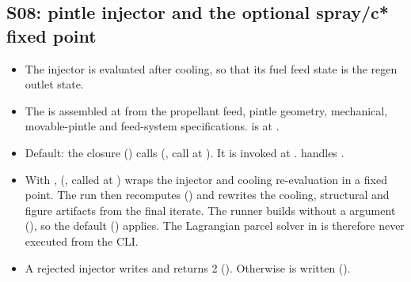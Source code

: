 \subsection{S08: pintle injector and the optional spray/c* fixed point}\label{sec:df-s08}
\begin{itemize}
  \item The injector is evaluated after cooling, so that its fuel feed state is the regen outlet state.
  \item The  is assembled at  from the propellant feed, pintle geometry, mechanical, movable-pintle and feed-system specifications.  is at .
  \item Default: the closure  () calls  (, call at ). It is invoked at .  handles .
  \item With ,  (, called at ) wraps the injector and cooling re-evaluation in a fixed point. The run then recomputes  () and rewrites the cooling, structural and figure artifacts from the final iterate. The runner builds  without a  argument (), so the default  () applies. The Lagrangian parcel solver in  is therefore never executed from the CLI.
  \item A rejected injector writes  and returns 2 (). Otherwise  is written ().
\end{itemize}

